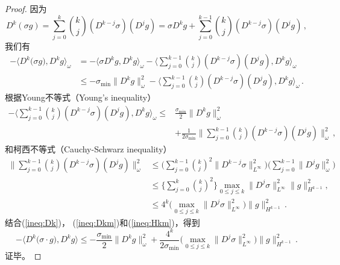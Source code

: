 \begin{proof}
  因为
  \begin{equation}
    D^k (\sigma g) = \sum_{j = 0}^k \binom{k}{j} (D^{k-j} \sigma) (D^j g) = \sigma D^k g + \sum_{j = 0}^{k-1} \binom{k}{j}(D^{k-j} \sigma) (D^j g)\,,
  \end{equation}
  我们有
  \begin{equation}\label{ineq:Dk}
    \begin{split}
      -\langle D^k\big(\sigma g\big), D^k g\rangle_\omega
      & = -\langle \sigma D^k g, D^k g \rangle_\omega -\Big\langle \sum_{j=0}^{k-1} \binom{k}{j}(D^{k-j} \sigma) (D^j g), D^k g \Big\rangle_\omega\,
      \\
      & \le -\sigma_{\mathrm{min}}\|D^k g\|^2_\omega -\Big\langle \sum_{j=0}^{k-1} \binom{k}{j}(D^{k-j} \sigma) (D^j g), D^k g \Big\rangle_\omega\,.
    \end{split}
  \end{equation}
  根据Young不等式（Young's inequality）
  \begin{equation}\label{ineq:Dkm}
    \begin{split}
      -\Big\langle \sum_{j=0}^{k-1} \binom{k}{j}(D^{k-j} \sigma) (D^j g), D^k g \Big\rangle_\omega \le
      {} & \frac{\sigma_{\mathrm{min}}}{2}\|D^k g\|^2_\omega
      \\
      {} & + \frac{1}{2\sigma_{\mathrm{min}}}\Big\|\sum_{j=0}^{k-1} \binom{k}{j}(D^{k-j} \sigma) (D^j g)\Big\|^2_\omega\,,
    \end{split}
  \end{equation}
  和柯西不等式（Cauchy-Schwarz inequality）
  \begin{equation}\label{ineq:Hkm}
    \begin{split}
      \Big\|\sum_{j=0}^{k-1} \binom{k}{j}(D^{k-j} \sigma) (D^j g)\Big\|^2_\omega
      & \le \Big(\sum_{j=0}^{k-1} \binom{k}{j}^2\|D^{k-j} \sigma\|^2_{L^\infty}\Big)\Big(\sum_{j=0}^{k-1}\|D^{j} g\|_\omega^2\Big)
      \\
      & \le \Big\{\sum_{j=0}^{k} \binom{k}{j}^2\Big\}\max\limits_{0\le j\le k}\|D^{j} \sigma\|^2_{L^\infty}\|g\|_{H^{k-1}}^2,
      \\
      & \le 4^k\big(\max\limits_{0\le j\le k}\|D^{j} \sigma\|^2_{L^\infty}\big)\|g\|_{H^{k-1}}^2\,.
    \end{split}
  \end{equation}
  结合(\ref{ineq:Dk})， (\ref{ineq:Dkm})和(\ref{ineq:Hkm})，得到
  \begin{equation}
    -\langle D^k\big(\sigma\cdot g\big), D^k g\rangle \le -\frac{\sigma_{\mathrm{min}}}{2}\|D^k g\|^2_\omega + \frac{4^k}{2\sigma_{\mathrm{min}}}\big(\max\limits_{0\le j\le k}\|D^{j} \sigma\|^2_{L^\infty}\big)\|g\|_{H^{k-1}}^2\,.
  \end{equation}
  证毕。
\end{proof}

